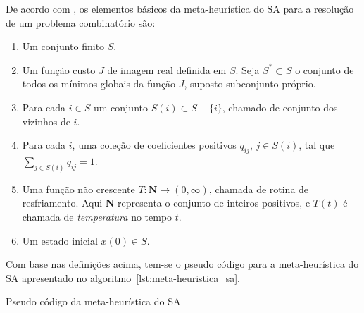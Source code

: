 De acordo com \cite{bertsimas1993simulated}, os elementos básicos da meta-heurística do SA
para a resolução de um problema combinatório são:

\begin{enumerate}
 \item Um conjunto finito $S$.
 \item Um função custo $J$ de imagem real definida em $S$. Seja $S^* \subset S$ o conjunto de todos os mínimos globais da
 função $J$, suposto subconjunto próprio.
 \item Para cada $i \in S$ um conjunto $S(i) \subset S - \{i\}$, chamado de conjunto dos vizinhos de $i$.
 \item Para cada $i$, uma coleção de coeficientes positivos $q_{ij}$, $j \in S(i)$, tal que $\sum_{j \in S(i)} q_{ij} = 1$.
 \item Uma função não crescente $T: \textbf{N} \rightarrow (0,\infty)$, chamada de rotina de resfriamento. Aqui \textbf{N}
 representa o conjunto de inteiros positivos, e $T(t)$ é chamada de \textit{temperatura} no tempo $t$.
 \item Um estado inicial $x(0) \in S$.
\end{enumerate}

Com base nas definições acima, tem-se o pseudo código para a meta-heurística do
SA apresentado no algoritmo~\ref{lst:meta-heuristica_sa}.

\begin{algorithm}[H]


\caption{Pseudo código da meta-heurística do SA}
\label{lst:meta-heuristica_sa}
\end{algorithm}


